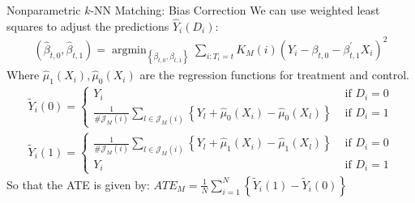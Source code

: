 \documentclass[aspectratio=169,11pt]{beamer}
\begin{document}
\begin{frame}{Nonparametric $k$-NN Matching: Bias Correction}
We can use weighted least squares to adjust the predictions $\hat{Y}_i(D_i)$:
\begin{align*}
\left(\widehat{\beta}_{t, 0}, \widehat{\beta}_{t, 1}\right)=\operatorname{argmin}_{\left\{\beta_{t, 0}, \beta_{t, 1}\right\}} \sum_{i: T_{i}=t} K_{M}(i)\left(Y_{i}-\beta_{t, 0}-\beta_{t, 1}^{\prime} X_{i}\right)^{2}
\end{align*}
Where $\widehat{\mu}_1(X_i),\widehat{\mu}_0(X_i)$ are the regression functions for treatment and control.
\begin{align*}
\tilde{Y}_{i}(0)=\left\{\begin{array}{cc}
Y_{i} & \text { if } D_{i}=0 \\
\frac{1}{\# \mathcal{J}_{M}(i)} \sum_{l \in \mathcal{J}_{M}(i)}\left\{Y_{l}+\widehat{\mu}_{0}\left(X_{i}\right)-\widehat{\mu}_{0}\left(X_{l}\right)\right\} & \text { if } D_{i}=1
\end{array}\right. \\
\tilde{Y}_{i}(1)=\left\{\begin{array}{cc}
\frac{1}{\# \mathcal{J}_{M}(i)} \sum_{l \in \mathcal{J}_{M}(i)}\left\{Y_{l}+\widehat{\mu}_{1}\left(X_{i}\right)-\widehat{\mu}_{1}\left(X_{l}\right)\right\} & \text { if } D_{i}=0 \\
Y_{i} & \text { if } D_{i}=1
\end{array}\right.
\end{align*}
So that the ATE is given by: $ATE_M=\frac{1}{N} \sum_{i=1}^{N}\left\{\tilde{Y}_{i}(1)-\tilde{Y}_{i}(0)\right\}$
\end{frame}
\end{document}
